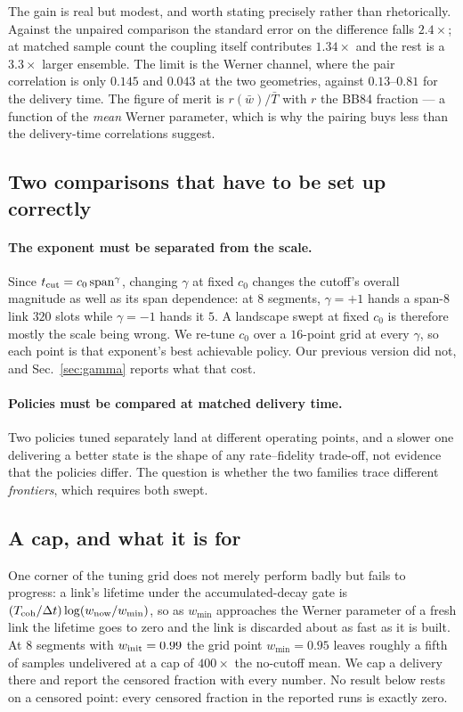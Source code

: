 \documentclass[aps,pra,twocolumn,superscriptaddress,floatfix,nofootinbib]{revtex4-2}
\begin{document}
The gain is real but modest, and worth stating precisely rather than
rhetorically. Against the unpaired comparison the standard error on the
difference falls $2.4\times$; at matched sample count the coupling itself
contributes $1.34\times$ and the rest is a $3.3\times$ larger ensemble. The
limit is the Werner channel, where the pair correlation is only $0.145$ and
$0.043$ at the two geometries, against $0.13$--$0.81$ for the delivery time. The
figure of merit is $r(\bar w)/\bar T$ with $r$ the BB84 fraction --- a function
of the \emph{mean} Werner parameter, which is why the pairing buys less than the
delivery-time correlations suggest.

\subsection{Two comparisons that have to be set up correctly}

\paragraph*{The exponent must be separated from the scale.} Since
$t_{\rm cut} = c_0\,{\rm span}^{\gamma}$, changing $\gamma$ at fixed $c_0$
changes the cutoff's overall magnitude as well as its span dependence: at $8$
segments, $\gamma=+1$ hands a span-$8$ link $320$ slots while $\gamma=-1$ hands
it $5$. A landscape swept at fixed $c_0$ is therefore mostly the scale being
wrong. We re-tune $c_0$ over a $16$-point grid at every $\gamma$, so each point
is that exponent's best achievable policy. Our previous version did not, and
Sec.~\ref{sec:gamma} reports what that cost.

\paragraph*{Policies must be compared at matched delivery time.} Two policies
tuned separately land at different operating points, and a slower one delivering
a better state is the shape of any rate--fidelity trade-off, not evidence that
the policies differ. The question is whether the two families trace different
\emph{frontiers}, which requires both swept.

\subsection{A cap, and what it is for}

One corner of the tuning grid does not merely perform badly but fails to
progress: a link's lifetime under the accumulated-decay gate is
$(T_{\rm coh}/\Delta t)\log(w_{\rm now}/w_{\min})$, so as $w_{\min}$ approaches
the Werner parameter of a fresh link the lifetime goes to zero and the link is
discarded about as fast as it is built. At $8$ segments with $w_{\rm init}=0.99$
the grid point $w_{\min}=0.95$ leaves roughly a fifth of samples undelivered at
a cap of $400\times$ the no-cutoff mean. We cap a delivery there and report the
censored fraction with every number. No result below rests on a censored point:
every censored fraction in the reported runs is exactly zero.
\end{document}
